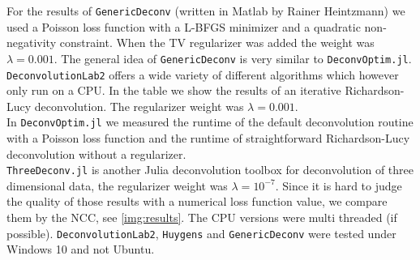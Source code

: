 \documentclass{juliacon}
\begin{document}
        For the results of \verb|GenericDeconv| (written in Matlab by Rainer Heintzmann) we used a Poisson loss function with a L-BFGS minimizer 
        and a quadratic non-negativity constraint.
        When the TV regularizer was added the weight was $\lambda = 0.001$.
        The general idea of \verb|GenericDeconv| is very similar to \verb|DeconvOptim.jl|.
        \verb|DeconvolutionLab2| offers a wide variety of different algorithms which however only run on a CPU. 
        In the table we show the results of an 
        iterative Richardson-Lucy deconvolution. The regularizer weight was $\lambda=0.001$.\\
        In \verb|DeconvOptim.jl| we measured the runtime of the default deconvolution routine with a Poisson loss function
        and the runtime of straightforward Richardson-Lucy deconvolution without a regularizer.\\
        \verb|ThreeDeconv.jl| is another Julia deconvolution toolbox for deconvolution of three dimensional data, the regularizer weight was $\lambda=10^{-7}$. 
        Since it is hard to judge the quality of those results with a numerical loss function value, 
        we compare them by the NCC, see \autoref{img:results}.
        The CPU versions were multi threaded (if possible). 
        \verb|DeconvolutionLab2|, \verb|Huygens| and \verb|GenericDeconv| were tested under Windows 10 and not Ubuntu.
\end{document}
